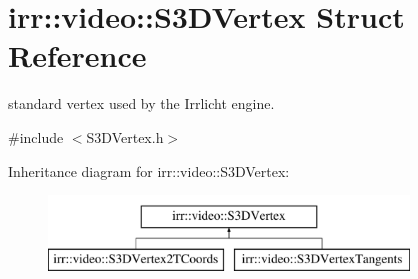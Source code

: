 \hypertarget{structirr_1_1video_1_1S3DVertex}{}\section{irr\+:\+:video\+:\+:S3\+D\+Vertex Struct Reference}
\label{structirr_1_1video_1_1S3DVertex}


standard vertex used by the Irrlicht engine.  




{\ttfamily \#include $<$S3\+D\+Vertex.\+h$>$}

Inheritance diagram for irr\+:\+:video\+:\+:S3\+D\+Vertex\+:\begin{figure}[H]
\begin{center}
\leavevmode
\includegraphics[height=2.000000cm]{structirr_1_1video_1_1S3DVertex}
\end{center}
\end{figure}
